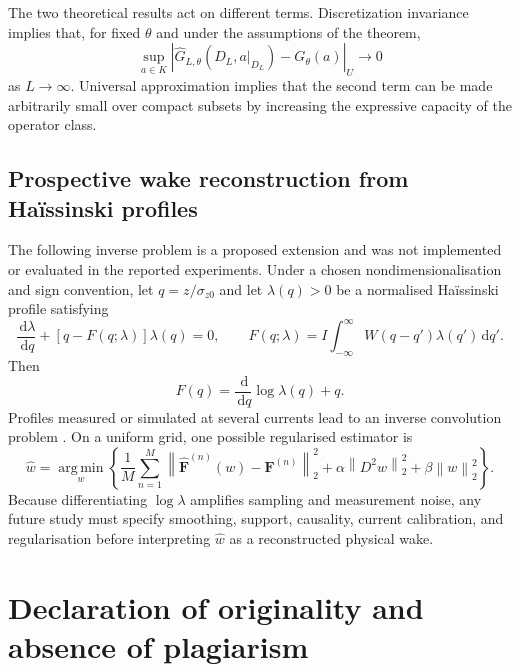 \documentclass[11pt,a4paper]{article}
\providecommand{\norm}[1]{\left\lVert#1\right\rVert}
\providecommand{\argmin}{\operatorname*{arg\,min}}
\providecommand{\dd}{\,\mathrm{d}}
\begin{document}
\begin{sloppypar}
The two theoretical results act on different terms. Discretization invariance implies that, for fixed $\theta$ and under the assumptions of the theorem,
\begin{equation}
\sup_{a\in K}
\left|
\widehat{G}_{L,\theta}
\left(
D_L,
a|_{D_L}
\right)
-
G_\theta(a)
\right|_U
\to
0
\end{equation}
as $L\to\infty$. Universal approximation implies that the second term can be made arbitrarily small over compact subsets by increasing the expressive capacity of the operator class.



\subsection{Prospective wake reconstruction from Ha\"issinski profiles}

The following inverse problem is a proposed extension and was not implemented or evaluated in the reported experiments. Under a chosen nondimensionalisation and sign convention, let \(q=z/\sigma_{z0}\) and let \(\lambda(q)>0\) be a normalised Ha\"issinski profile satisfying
\begin{equation}
    \frac{\dd\lambda}{\dd q}
    +\left[q-F(q;\lambda)\right]\lambda(q)=0,
    \qquad
    F(q;\lambda)
    =I\int_{-\infty}^{\infty}W(q-q')\lambda(q')\dd q'.
    \label{eq:app_haissinski_inverse_start}
\end{equation}
Then
\begin{equation}
    F(q)=\frac{\dd}{\dd q}\log\lambda(q)+q.
\end{equation}
Profiles measured or simulated at several currents lead to an inverse convolution problem \cite{zhou_theories_2023,funkner_haissinski_2025}. On a uniform grid, one possible regularised estimator is
\begin{equation}
    \widehat{w}
    =
    \argmin_{w}
    \left\{
        \frac{1}{M}
        \sum_{n=1}^{M}
        \norm{
            \widehat{\bm F}^{(n)}(w)-\bm F^{(n)}
        }_2^2
        +\alpha\norm{D^2w}_2^2
        +\beta\norm{w}_2^2
    \right\}.
    \label{eq:app_wake_inverse_objective}
\end{equation}
Because differentiating \(\log\lambda\) amplifies sampling and measurement noise, any future study must specify smoothing, support, causality, current calibration, and regularisation before interpreting \(\widehat{w}\) as a reconstructed physical wake.
\clearpage
\section{Declaration of originality and absence of plagiarism}
\label{app:declaration-originality}


\end{sloppypar}
\end{document}
